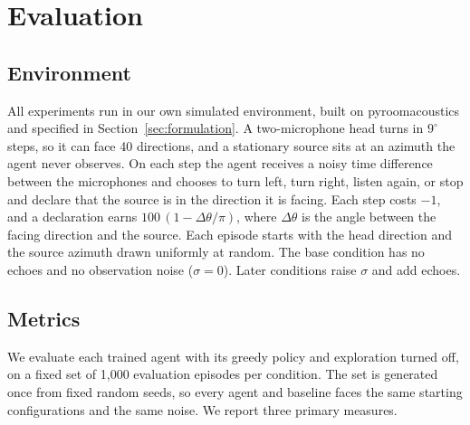 \documentclass{article}
\begin{document}

\section{Evaluation}
\label{sec:evaluation}

\subsection{Environment}

All experiments run in our own simulated environment, built on
pyroomacoustics and specified in Section~\ref{sec:formulation}. A two-microphone
head turns in $9^\circ$ steps, so it can face 40 directions, and a stationary
source sits at an azimuth the agent never observes. On each step the agent
receives a noisy time difference between the microphones and chooses to turn
left, turn right, listen again, or stop and declare that the source is in the
direction it is facing. Each step costs $-1$, and a declaration earns
$100\,(1 - \Delta\theta/\pi)$, where $\Delta\theta$ is the angle between the
facing direction and the source. Each episode starts with the head direction
and the source azimuth drawn uniformly at random. The base condition has no
echoes and no observation noise ($\sigma = 0$). Later conditions raise
$\sigma$ and add echoes.

\subsection{Metrics}

We evaluate each trained agent with its greedy policy and exploration turned
off, on a fixed set of 1{,}000 evaluation episodes per condition. The set is
generated once from fixed random seeds, so every agent and baseline faces the
same starting configurations and the same noise. We report three primary
measures.
\end{document}
